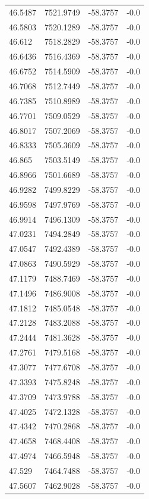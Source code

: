 \begin{table}[H]
\begin{tabular}{llll}
46.5487 & 7521.9749 & -58.3757 & -0.0 \\
46.5803 & 7520.1289 & -58.3757 & -0.0 \\
46.612 & 7518.2829 & -58.3757 & -0.0 \\
46.6436 & 7516.4369 & -58.3757 & -0.0 \\
46.6752 & 7514.5909 & -58.3757 & -0.0 \\
46.7068 & 7512.7449 & -58.3757 & -0.0 \\
46.7385 & 7510.8989 & -58.3757 & -0.0 \\
46.7701 & 7509.0529 & -58.3757 & -0.0 \\
46.8017 & 7507.2069 & -58.3757 & -0.0 \\
46.8333 & 7505.3609 & -58.3757 & -0.0 \\
46.865 & 7503.5149 & -58.3757 & -0.0 \\
46.8966 & 7501.6689 & -58.3757 & -0.0 \\
46.9282 & 7499.8229 & -58.3757 & -0.0 \\
46.9598 & 7497.9769 & -58.3757 & -0.0 \\
46.9914 & 7496.1309 & -58.3757 & -0.0 \\
47.0231 & 7494.2849 & -58.3757 & -0.0 \\
47.0547 & 7492.4389 & -58.3757 & -0.0 \\
47.0863 & 7490.5929 & -58.3757 & -0.0 \\
47.1179 & 7488.7469 & -58.3757 & -0.0 \\
47.1496 & 7486.9008 & -58.3757 & -0.0 \\
47.1812 & 7485.0548 & -58.3757 & -0.0 \\
47.2128 & 7483.2088 & -58.3757 & -0.0 \\
47.2444 & 7481.3628 & -58.3757 & -0.0 \\
47.2761 & 7479.5168 & -58.3757 & -0.0 \\
47.3077 & 7477.6708 & -58.3757 & -0.0 \\
47.3393 & 7475.8248 & -58.3757 & -0.0 \\
47.3709 & 7473.9788 & -58.3757 & -0.0 \\
47.4025 & 7472.1328 & -58.3757 & -0.0 \\
47.4342 & 7470.2868 & -58.3757 & -0.0 \\
47.4658 & 7468.4408 & -58.3757 & -0.0 \\
47.4974 & 7466.5948 & -58.3757 & -0.0 \\
47.529 & 7464.7488 & -58.3757 & -0.0 \\
47.5607 & 7462.9028 & -58.3757 & -0.0 \\

\end{tabular}
\end{table}
